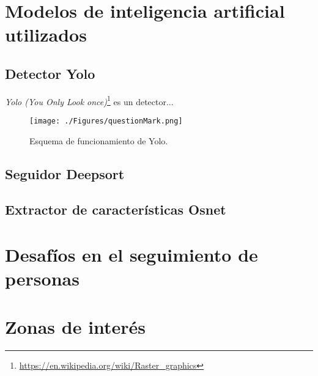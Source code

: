 \section{Modelos de inteligencia artificial utilizados}
\label{sec:requerimientos}

\subsection{Detector Yolo}

\textit{Yolo (You Only Look once)}\footnote{\url{https://en.wikipedia.org/wiki/Raster_graphics}} es un detector...


\begin{figure}[ht]
	\centering
	\texttt{[image: ./Figures/questionMark.png]}
	\caption{Esquema de funcionamiento de Yolo.}
	\label{fig:diagramaYolo}
\end{figure}



\subsection{Seguidor Deepsort}

\subsection{Extractor de características Osnet}


\section{Desafíos en el seguimiento de personas}
\label{sec:desafiosSeguimiento}


\section{Zonas de interés}
\label{sec:zonasInteres}
